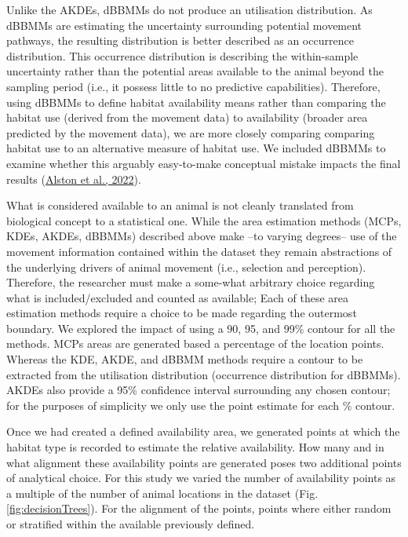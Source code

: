 \documentclass[10pt,a4paper]{article}
\begin{document}
Unlike the AKDEs, dBBMMs do not produce an utilisation distribution.
As dBBMMs are estimating the uncertainty surrounding potential movement pathways, the resulting distribution is better described as an occurrence distribution.
This occurrence distribution is describing the within-sample uncertainty rather than the potential areas available to the animal beyond the sampling period (i.e., it possess little to no predictive capabilities).
Therefore, using dBBMMs to define habitat availability means rather than comparing the habitat use (derived from the movement data) to availability (broader area predicted by the movement data), we are more closely comparing comparing habitat use to an alternative measure of habitat use.
We included dBBMMs to examine whether this arguably easy-to-make conceptual mistake impacts the final results (\protect\hyperlink{ref-alston_clarifying_2022}{Alston et al., 2022}).

What is considered available to an animal is not cleanly translated from biological concept to a statistical one.
While the area estimation methods (MCPs, KDEs, AKDEs, dBBMMs) described above make --to varying degrees-- use of the movement information contained within the dataset they remain abstractions of the underlying drivers of animal movement (i.e., selection and perception).
Therefore, the researcher must make a some-what arbitrary choice regarding what is included/excluded and counted as available; Each of these area estimation methods require a choice to be made regarding the outermost boundary.
We explored the impact of using a 90, 95, and 99\% contour for all the methods.
MCPs areas are generated based a percentage of the location points.
Whereas the KDE, AKDE, and dBBMM methods require a contour to be extracted from the utilisation distribution (occurrence distribution for dBBMMs).
AKDEs also provide a 95\% confidence interval surrounding any chosen contour; for the purposes of simplicity we only use the point estimate for each \% contour.

Once we had created a defined availability area, we generated points at which the habitat type is recorded to estimate the relative availability.
How many and in what alignment these availability points are generated poses two additional points of analytical choice.
For this study we varied the number of availability points as a multiple of the number of animal locations in the dataset (Fig. \ref{fig:decisionTrees}).
For the alignment of the points, points where either random or stratified within the available previously defined.
\end{document}
